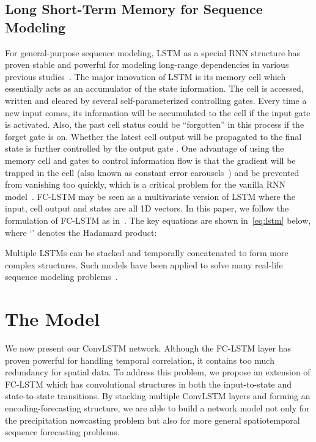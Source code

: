 \documentclass{article} \usepackage{amsmath}
\begin{document}
\subsection{Long Short-Term Memory for Sequence Modeling}
For general-purpose sequence modeling, LSTM as a special RNN structure has proven stable and powerful for modeling long-range dependencies in various previous studies~\cite{hochreiter1997long,graves2013generating,pascanu2013difficulty,sutskever2014sequence}. The major innovation of LSTM is its memory cell  which essentially acts as an accumulator of the state information. The cell is accessed, written and cleared by several self-parameterized controlling gates. Every time a new input comes, its information will be accumulated to the cell if the input gate  is activated. Also, the past cell status  could be ``forgotten'' in this process if the forget gate  is on. Whether the latest cell output  will be propagated to the final state  is further controlled by the output gate . One advantage of using the memory cell and gates to control information flow is that the gradient will be trapped in the cell (also known as constant error carousels~\cite{hochreiter1997long}) and be prevented from vanishing too quickly, which is a critical problem for the vanilla RNN model~\cite{hochreiter1997long,pascanu2013difficulty,Bengio-et-al-2015-Book}. FC-LSTM may be seen as a multivariate version of LSTM where the input, cell output and states are all 1D vectors.  In this paper, we follow the formulation of FC-LSTM as in~\cite{graves2013generating}.  The key equations are shown in~\eqref{eq:lstm} below, where `' denotes the Hadamard product:

Multiple LSTMs can be stacked and temporally concatenated to form more complex structures.  Such models have been applied to solve many real-life sequence modeling problems~\cite{sutskever2014sequence,xu2015show}.



\section{The Model}
We now present our ConvLSTM network. Although the FC-LSTM layer has proven powerful for handling temporal correlation, it contains too much redundancy for spatial data. To address this problem, we propose an extension of FC-LSTM which has convolutional structures in both the input-to-state and state-to-state transitions. By stacking multiple ConvLSTM layers and forming an encoding-forecasting structure, we are able to build a network model not only for the precipitation nowcasting problem but also for more general spatiotemporal sequence forecasting problems.
\end{document}
